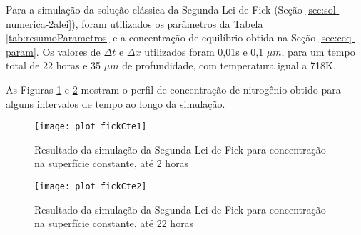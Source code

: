 \FloatBarrier
Para a simulação da solução clássica da Segunda Lei de Fick (Seção \ref{sec:sol-numerica-2alei}), foram utilizados 
os parâmetros da Tabela \ref{tab:resumoParametros} e a concentração de equilíbrio obtida na Seção \ref{sec:ceq-param}. Os valores de $\Delta t$ e $\Delta x$ utilizados foram 0,01s e 0,1 $\mu m$, para um tempo total de 22 horas e 35 $\mu m$ de profundidade, com temperatura igual a 718K.

As Figuras \ref{fig:fick-cscte} e \ref{fig:fick-cscte2} mostram o perfil de concentração de nitrogênio obtido para alguns intervalos de tempo ao longo da simulação.

\begin{figure}[ht]
\centering
	\caption{Resultado da simulação da Segunda Lei de Fick para concentração na superfície constante, até 2 horas}
	\texttt{[image: plot\_fickCte1]}
	\label{fig:fick-cscte}
	\centering
\end{figure}


\begin{figure}[ht]
\centering
	\caption{Resultado da simulação da Segunda Lei de Fick para concentração na superfície constante, até 22 horas}
	\texttt{[image: plot\_fickCte2]}
	\label{fig:fick-cscte2}
	\centering
\end{figure}

\FloatBarrier